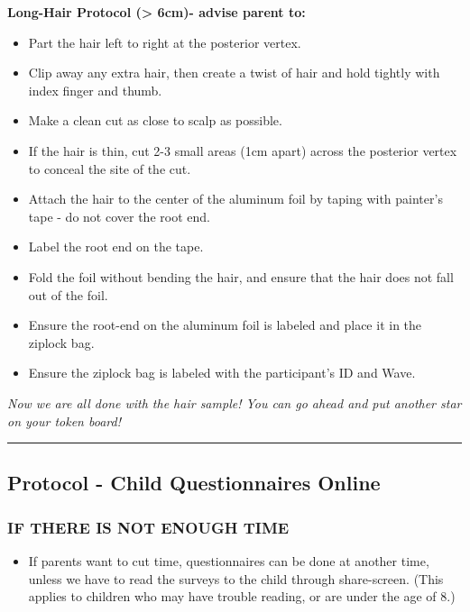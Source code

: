 \documentclass[]{book}
\providecommand{\tightlist}{%
  \setlength{\itemsep}{0pt}\setlength{\parskip}{0pt}}
\begin{document}
\textbf{Long-Hair Protocol (\textgreater{} 6cm)- advise parent to:}

\begin{itemize}
\tightlist
\item
  Part the hair left to right at the posterior vertex.
\item
  Clip away any extra hair, then create a twist of hair and hold tightly with index finger and thumb.
\item
  Make a clean cut as close to scalp as possible.
\item
  If the hair is thin, cut 2-3 small areas (1cm apart) across the posterior vertex to conceal the site of the cut.
\item
  Attach the hair to the center of the aluminum foil by taping with painter's tape - do not cover the root end.
\item
  Label the root end on the tape.
\item
  Fold the foil without bending the hair, and ensure that the hair does not fall out of the foil.
\item
  Ensure the root-end on the aluminum foil is labeled and place it in the ziplock bag.
\item
  Ensure the ziplock bag is labeled with the participant's ID and Wave.
\end{itemize}

\emph{Now we are all done with the hair sample! You can go ahead and put another star on your token board!}

\begin{center}\rule{0.5\linewidth}{0.5pt}\end{center}

\hypertarget{protocol---child-questionnaires-online}{%
\subsection{Protocol - Child Questionnaires Online}\label{protocol---child-questionnaires-online}}

\hypertarget{if-there-is-not-enough-time}{%
\subsubsection{IF THERE IS NOT ENOUGH TIME}\label{if-there-is-not-enough-time}}

\begin{itemize}
\tightlist
\item
  If parents want to cut time, questionnaires can be done at another time, unless we have to read the surveys to the child through share-screen. (This applies to children who may have trouble reading, or are under the age of 8.)
\end{itemize}
\end{document}
